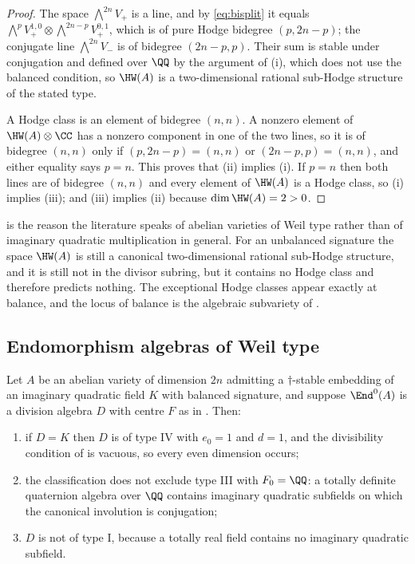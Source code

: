 \begin{proof}
The space $\bigwedge^{2n}V_{+}$ is a line, and by \eqref{eq:bisplit} it equals
$\bigwedge^{p}V^{1,0}_{+}\otimes\bigwedge^{2n-p}V^{0,1}_{+}$, which is of pure
Hodge bidegree $(p,2n-p)$; the conjugate line $\bigwedge^{2n}V_{-}$ is of
bidegree $(2n-p,p)$. Their sum is stable under conjugation and defined over
$\QQ$ by the argument of (i), which does not use the
balanced condition, so $\HW(A)$ is a two-dimensional rational sub-Hodge
structure of the stated type.

A Hodge class is an element of bidegree $(n,n)$. A nonzero element of
$\HW(A)\otimes\CC$ has a nonzero component in one of the two lines, so it is of
bidegree $(n,n)$ only if $(p,2n-p)=(n,n)$ or $(2n-p,p)=(n,n)$, and either
equality says $p=n$. This proves that (ii) implies (i). If $p=n$ then both
lines are of bidegree $(n,n)$ and every element of $\HW(A)$ is a Hodge class,
so (i) implies (iii); and (iii) implies (ii) because $\dim\HW(A)=2>0$.
\end{proof}

\begin{remark}\label{rem:onlybalanced}
 is the reason the literature speaks of abelian
varieties of Weil type rather than of imaginary quadratic multiplication in
general. For an unbalanced signature the space $\HW(A)$ is still a canonical
two-dimensional rational sub-Hodge structure, and it is still not in the
divisor subring, but it contains no Hodge class and therefore predicts
nothing. The exceptional Hodge classes appear exactly at balance, and the
locus of balance is the algebraic subvariety of .
\end{remark}

\subsection{Endomorphism algebras of Weil type}

\begin{proposition}\label{prop:whichtypes}
Let $A$ be an abelian variety of dimension $2n$ admitting a $\dagger$-stable
embedding of an imaginary quadratic field $K$ with balanced signature, and
suppose $\End^{0}(A)$ is a division algebra $D$ with centre $F$ as in
. Then:
\begin{enumerate}[label=\textup{(\roman*)},nosep]
\item if $D=K$ then $D$ is of type IV with $e_{0}=1$ and $d=1$, and the
  divisibility condition of  is vacuous, so every even
  dimension occurs;
\item the classification does not exclude type III with $F_{0}=\QQ$: a
  totally definite quaternion algebra over $\QQ$ contains imaginary
  quadratic subfields on which the canonical involution is conjugation;
\item $D$ is not of type I, because a totally real field contains no
  imaginary quadratic subfield.
\end{enumerate}
\end{proposition}

